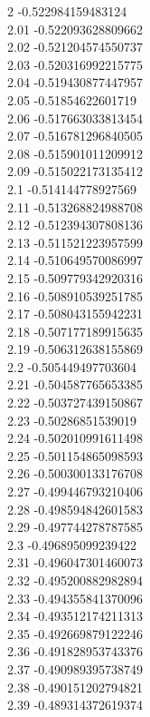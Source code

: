 {2	-0.522984159483124\\
2.01	-0.522093628809662\\
2.02	-0.521204574550737\\
2.03	-0.520316992215775\\
2.04	-0.519430877447957\\
2.05	-0.51854622601719\\
2.06	-0.517663033813454\\
2.07	-0.516781296840505\\
2.08	-0.515901011209912\\
2.09	-0.515022173135412\\
2.1	-0.514144778927569\\
2.11	-0.513268824988708\\
2.12	-0.512394307808136\\
2.13	-0.511521223957599\\
2.14	-0.510649570086997\\
2.15	-0.509779342920316\\
2.16	-0.508910539251785\\
2.17	-0.508043155942231\\
2.18	-0.507177189915635\\
2.19	-0.506312638155869\\
2.2	-0.505449497703604\\
2.21	-0.504587765653385\\
2.22	-0.503727439150867\\
2.23	-0.50286851539019\\
2.24	-0.502010991611498\\
2.25	-0.501154865098593\\
2.26	-0.500300133176708\\
2.27	-0.499446793210406\\
2.28	-0.498594842601583\\
2.29	-0.497744278787585\\
2.3	-0.496895099239422\\
2.31	-0.496047301460073\\
2.32	-0.495200882982894\\
2.33	-0.494355841370096\\
2.34	-0.493512174211313\\
2.35	-0.492669879122246\\
2.36	-0.491828953743376\\
2.37	-0.490989395738749\\
2.38	-0.490151202794821\\
2.39	-0.489314372619374\\
}
